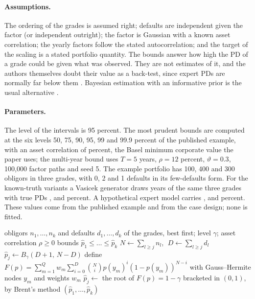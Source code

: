 \paragraph{Assumptions.} The ordering of the grades is assumed right; defaults are independent given the factor (or independent outright); the factor is Gaussian with a known asset correlation; the yearly factors follow the stated autocorrelation; and the target of the scaling is a stated portfolio quantity. The bounds answer how high the PD of a grade could be given what was observed. They are not estimates of it, and the authors themselves doubt their value as a back-test, since expert PDs are normally far below them \citep{ratings:plutotasche2006}. Bayesian estimation with an informative prior is the usual alternative \citep{ratings:kiefer2006}.

\paragraph{Parameters.} The level of the intervals is 95 percent. The most prudent bounds are computed at the six levels 50, 75, 90, 95, 99 and 99.9 percent of the published example, with an asset correlation of \rtgLdpRho{} percent, the Basel minimum corporate value the paper uses; the multi-year bound uses $T=5$ years, $\rho=12$ percent, $\vartheta=0.3$, 100,000 factor paths and seed 5. The example portfolio has 100, 400 and 300 obligors in three grades, with 0, 2 and 1 defaults in its few-defaults form. For the known-truth variants a Vasicek generator draws \rtgSimYears{} years of the same three grades with true PDs \rtgSimTrueA{}, \rtgSimTrueB{} and \rtgSimTrueC{} percent. A hypothetical expert model carries \rtgLdpExpertA{}, \rtgLdpExpertB{} and \rtgLdpExpertC{} percent. These values come from the published example and from the case design; none is fitted.

\begin{algorithm}[htbp]
\caption{Most prudent PD bounds for ordered grades, independent or correlated defaults.}
\label{alg:ratings-prudent}
\begin{algorithmic}[1]
\Require obligors $n_1,\dots,n_k$ and defaults $d_1,\dots,d_k$ of the grades, best first; level $\gamma$; asset correlation $\rho\ge 0$
\Ensure bounds $\hat p_1\le\dots\le\hat p_k$
  \State $N\gets\sum_{l\ge j}n_l$, $\;D\gets\sum_{l\ge j}d_l$ 
    \State $\hat p_j\gets B_{\gamma}(D+1,\,N-D)$ 
  \Else
    \State define $F(p)=\sum_{m=1}^{Q}w_m\sum_{i=0}^{D}\binom{N}{i}p(y_m)^i(1-p(y_m))^{N-i}$ with Gauss--Hermite nodes $y_m$ and weights $w_m$
    \State $\hat p_j\gets$ the root of $F(p)=1-\gamma$ bracketed in $(0,1)$, by Brent's method 
  \EndIf
\EndFor
\State \Return $(\hat p_1,\dots,\hat p_k)$
\end{algorithmic}
\end{algorithm}

